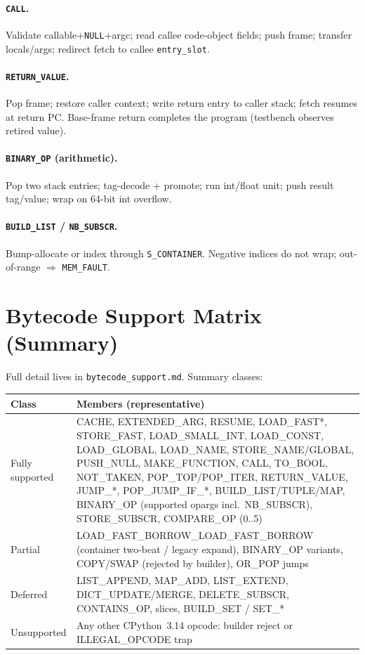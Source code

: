 \documentclass[11pt,a4paper]{article}
\newcommand{\opcode}[1]{\texttt{\textbf{#1}}}
\newcommand{\tagname}[1]{\texttt{#1}}
\begin{document}
\paragraph{\opcode{CALL}.}
Validate callable+\tagname{NULL}+argc; read callee code-object fields; push
frame; transfer locals/args; redirect fetch to callee \texttt{entry\_slot}.

\paragraph{\opcode{RETURN\_VALUE}.}
Pop frame; restore caller context; write return entry to caller stack; fetch
resumes at return PC. Base-frame return completes the program (testbench
observes retired value).

\paragraph{\opcode{BINARY\_OP} (arithmetic).}
Pop two stack entries; tag-decode + promote; run int/float unit; push result
tag/value; wrap on 64-bit int overflow.

\paragraph{\opcode{BUILD\_LIST} / \opcode{NB\_SUBSCR}.}
Bump-allocate or index through \texttt{S\_CONTAINER}. Negative indices do not
wrap; out-of-range $\Rightarrow$ \texttt{MEM\_FAULT}.

\section{Bytecode Support Matrix (Summary)}
\label{sec:bytecode}

Full detail lives in \texttt{bytecode\_support.md}. Summary classes:

\begin{center}
\begin{tabular}{@{}p{3.3cm}p{11cm}@{}}
\toprule
\textbf{Class} & \textbf{Members (representative)} \\
\midrule
Fully supported &
  CACHE, EXTENDED\_ARG, RESUME, LOAD\_FAST*, STORE\_FAST, LOAD\_SMALL\_INT,
  LOAD\_CONST, LOAD\_GLOBAL, LOAD\_NAME, STORE\_NAME/GLOBAL, PUSH\_NULL,
  MAKE\_FUNCTION, CALL, TO\_BOOL, NOT\_TAKEN, POP\_TOP/POP\_ITER,
  RETURN\_VALUE, JUMP\_*, POP\_JUMP\_IF\_*, BUILD\_LIST/TUPLE/MAP,
  BINARY\_OP (supported opargs incl.\ NB\_SUBSCR), STORE\_SUBSCR, COMPARE\_OP (0..5) \\
Partial &
  LOAD\_FAST\_BORROW\_LOAD\_FAST\_BORROW (container two-beat / legacy expand),
  BINARY\_OP variants, COPY/SWAP (rejected by builder), OR\_POP jumps \\
Deferred &
  LIST\_APPEND, MAP\_ADD, LIST\_EXTEND, DICT\_UPDATE/MERGE, DELETE\_SUBSCR,
  CONTAINS\_OP, slices, BUILD\_SET / SET\_* \\
Unsupported &
  Any other CPython~3.14 opcode: builder reject or ILLEGAL\_OPCODE trap \\
\bottomrule
\end{tabular}
\end{center}
\end{document}
